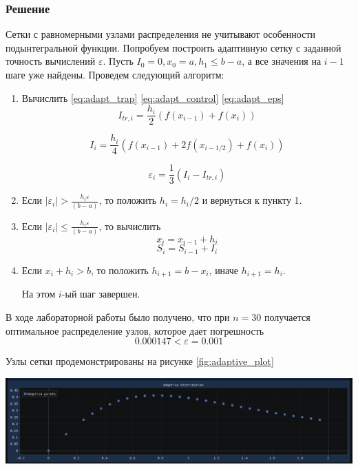 \documentclass[a4paper, fontsize=14pt]{article}
\begin{document}
\subsubsection*{Решение}
    Сетки с равномерными узлами распределения не учитывают особенности подынтегральной функции.
    Попробуем построить адаптивную сетку с заданной точность вычислений $\varepsilon$.
    Пусть $I_0 = 0, x_0 = a, h_1 \leq b - a$, а все значения на $i-1$ шаге уже найдены. Проведем следующий алгоритм: 
\begin{enumerate}
    \item Вычислить \eqref{eq:adapt_trap} \eqref{eq:adapt_control} \eqref{eq:adapt_eps}
    \begin{equation}
        \label{eq:adapt_trap}
        I_{tr, i} = \frac{h_i}{2} ( f(x_{i-1}) + f(x_i) )
    \end{equation}

    \begin{equation}
        \label{eq:adapt_control}
        I_i = \frac{h_i}{4} ( f(x_{i-1}) + 2 f(x_{i-1/2}) + f(x_i)  )
    \end{equation}
    
    \begin{equation}
        \label{eq:adapt_eps}
        \varepsilon_i = \frac{1}{3} (I_i - I_{tr, i})
    \end{equation}
    \item Если $|\varepsilon_i| >  \frac{h_i \varepsilon}{(b - a)}$, то положить $h_i = h_i / 2$ и вернуться к пункту 1.
    \item Если $|\varepsilon_i| \leq \frac{h_i \varepsilon}{(b - a)}$, то вычислить $$x_i = x_{i-1} + h_i$$  $$S_i = S_{i-1} + I_i$$
    \item Если $x_i + h_i > b$, то положить $h_{i+1} = b - x_i$, иначе $h_{i+1} = h_i$. 
    
    На этом $i$-ый шаг завершен.
\end{enumerate}
    В ходе лабораторной работы было получено, что при $n = 30$ получается оптимальное распределение узлов, которое дает погрешность $$ 0.000147 < \varepsilon = 0.001$$
    
    Узлы сетки продемонстрированы на рисунке \ref{fig:adaptive_plot}
   \begin{center}
        \includegraphics[scale=0.6]{src/adaptive_distribution.png}
        \label{fig:adaptive_plot}
    \end{center}
\end{document}
